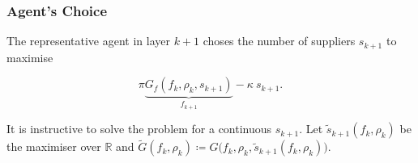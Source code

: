\documentclass[american, abstract=on]{scrartcl}
\theoremstyle{plain}
\renewcommand{\Re}{\mathbb{R}}
\begin{document}
\subsubsection{Agent's Choice}

The representative agent in layer $k + 1$ choses the number of suppliers $s_{k+1}$ to maximise

\begin{equation}
  \pi \underbrace{G_f(f_k, \rho_k, s_{k + 1})}_{f_{k + 1}} - \kappa \  s_{k + 1}.
\end{equation}

It is instructive to solve the problem for a continuous $s_{k+1}$. Let $\tilde{s}_{k + 1}(f_k, \rho_k)$ be the maximiser over $\Re$ and $\tilde{G}(f_k, \rho_k) \coloneqq G\big(f_k, \rho_k,  \tilde{s}_{k + 1}(f_k, \rho_k)\big)$.

\newpage
\nocite{*}
\printbibliography
\end{document}
